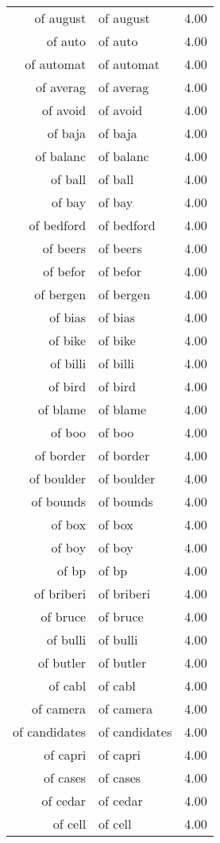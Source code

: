 \begin{table}[ht]
\begin{tabular}{rlr}
  of august & of august & 4.00 \\ 
  of auto & of auto & 4.00 \\ 
  of automat & of automat & 4.00 \\ 
  of averag & of averag & 4.00 \\ 
  of avoid & of avoid & 4.00 \\ 
  of baja & of baja & 4.00 \\ 
  of balanc & of balanc & 4.00 \\ 
  of ball & of ball & 4.00 \\ 
  of bay & of bay & 4.00 \\ 
  of bedford & of bedford & 4.00 \\ 
  of beers & of beers & 4.00 \\ 
  of befor & of befor & 4.00 \\ 
  of bergen & of bergen & 4.00 \\ 
  of bias & of bias & 4.00 \\ 
  of bike & of bike & 4.00 \\ 
  of billi & of billi & 4.00 \\ 
  of bird & of bird & 4.00 \\ 
  of blame & of blame & 4.00 \\ 
  of boo & of boo & 4.00 \\ 
  of border & of border & 4.00 \\ 
  of boulder & of boulder & 4.00 \\ 
  of bounds & of bounds & 4.00 \\ 
  of box & of box & 4.00 \\ 
  of boy & of boy & 4.00 \\ 
  of bp & of bp & 4.00 \\ 
  of briberi & of briberi & 4.00 \\ 
  of bruce & of bruce & 4.00 \\ 
  of bulli & of bulli & 4.00 \\ 
  of butler & of butler & 4.00 \\ 
  of cabl & of cabl & 4.00 \\ 
  of camera & of camera & 4.00 \\ 
  of candidates & of candidates & 4.00 \\ 
  of capri & of capri & 4.00 \\ 
  of cases & of cases & 4.00 \\ 
  of cedar & of cedar & 4.00 \\ 
  of cell & of cell & 4.00 \\ 

\end{tabular}
\end{table}
